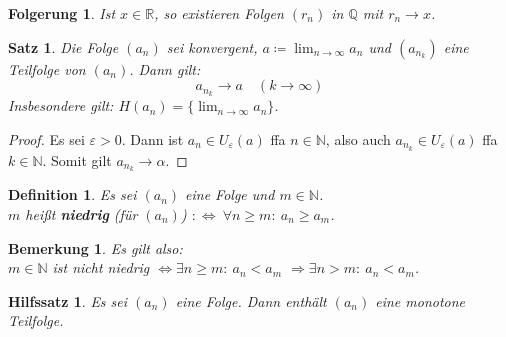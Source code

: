 \documentclass[12pt]{extreport} %
\newcommand{\N}{\mathbb{N}}
\newcommand{\Q}{\mathbb{Q}}
\newcommand{\R}{\mathbb{R}}
\theoremstyle{named}
\theoremstyle{itshape}
\newtheorem{satz}[unnamedtheorem]{Satz}
\newtheorem*{definition}{Definition}
\newtheorem{hilfssatz}[unnamedtheorem]{Hilfssatz}
\theoremstyle{normal}
\newtheorem*{bemerkung}{Bemerkung}
\newtheorem*{folgerung*}{Folgerung}
\begin{document}
\begin{folgerung*}
Ist $x \in \R$, so existieren Folgen $(r_{n})$ in $\Q$ mit $r_{n} \rightarrow x$.	
\end{folgerung*}


\begin{satz} \label{2.11:satz} 
	Die Folge $(a_{n})$ sei konvergent, $a \coloneqq \lim_{n \to \infty} a_{n}$ und $(a_{n_{k}})$ eine Teilfolge von $(a_{n})$. Dann gilt:
	$$ a_{n_{k}} \rightarrow a \quad (k \rightarrow \infty) $$
	Insbesondere gilt: $H(a_{n}) = \{ \lim_{n \to \infty} a_{n} \}$.
\end{satz}

\begin{proof}
	Es sei $\varepsilon > 0$. Dann ist $a_{n} \in U_{\varepsilon}(a)$ ffa $n \in \N$, also auch $a_{n_{k}} \in U_{\varepsilon}(a)$ ffa $k \in \N$. Somit gilt 
	$a_{n_{k}} \rightarrow \alpha$.
\end{proof}

\begin{definition} Es sei $(a_{n})$ eine Folge und $m \in \N$. \\
$m$ hei{\ss}t \textbf{niedrig} (für $(a_{n})$) $:\iff ~\forall n \geq m: ~  a_{n} \geq a_{m}$.		
\end{definition}

\begin{bemerkung}
Es gilt also: \\
$m \in \N$ ist nicht niedrig $\iff \exists n \geq m: ~ a_{n} < a_{m}$ $\Rightarrow \exists n > m: ~ a_{n} < a_{m}$.
\end{bemerkung}


\begin{hilfssatz} \label{HS2}
	Es sei $(a_{n})$ eine Folge. Dann enthält $(a_{n})$ eine monotone Teilfolge.	
\end{hilfssatz}
\end{document}
